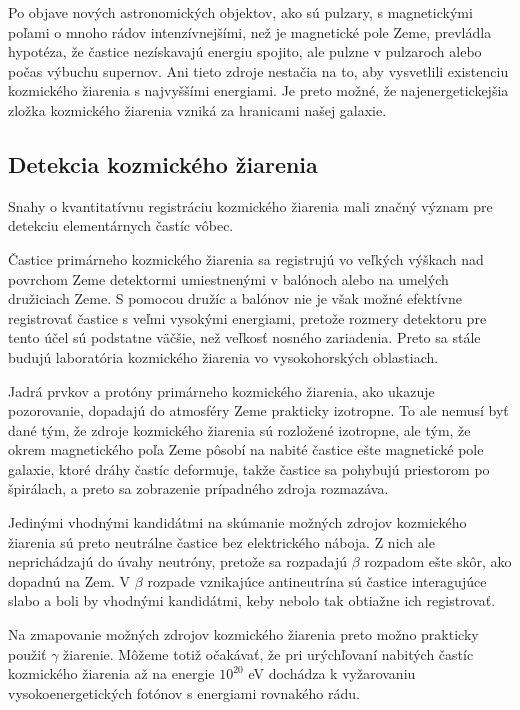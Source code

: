 \documentclass[../../main.tex]{subfiles}
\begin{document}
Po objave nových astronomických objektov, ako sú pulzary, s magnetickými poľami o mnoho rádov intenzívnejšími, než je magnetické pole Zeme, prevládla hypotéza, že častice nezískavajú energiu spojito, ale pulzne v pulzaroch alebo počas výbuchu supernov. Ani tieto zdroje nestačia na to, aby vysvetlili existenciu kozmického žiarenia s najvyššími energiami. Je preto možné, že najenergetickejšia zložka kozmického žiarenia vzniká za hranicami našej galaxie.

\subsection{Detekcia kozmického žiarenia}

Snahy o kvantitatívnu registráciu kozmického žiarenia mali značný význam pre detekciu elementárnych častíc vôbec.

Častice primárneho kozmického žiarenia sa registrujú vo veľkých výškach nad povrchom Zeme detektormi umiestnenými v balónoch alebo na umelých družiciach Zeme. S pomocou družíc a balónov nie je však možné efektívne registrovať častice s veľmi vysokými energiami, pretože rozmery detektoru pre tento účel sú podstatne väčšie, než veľkosť nosného zariadenia. Preto sa stále budujú laboratória kozmického žiarenia vo vysokohorských oblastiach.

Jadrá prvkov a protóny primárneho kozmického žiarenia, ako ukazuje pozorovanie, dopadajú do atmosféry Zeme prakticky izotropne. To ale nemusí byť dané tým, že zdroje kozmického žiarenia sú rozložené izotropne, ale tým, že okrem magnetického poľa Zeme pôsobí na nabité častice ešte magnetické pole galaxie, ktoré dráhy častíc deformuje, takže častice sa pohybujú priestorom po špirálach, a preto sa zobrazenie prípadného zdroja rozmazáva.

Jedinými vhodnými kandidátmi na skúmanie možných zdrojov kozmického žiarenia sú preto neutrálne častice bez elektrického náboja. Z nich ale neprichádzajú do úvahy neutróny, pretože sa rozpadajú $\beta$ rozpadom ešte skôr, ako dopadnú na Zem. V $\beta$ rozpade vznikajúce antineutrína sú častice interagujúce slabo a boli by vhodnými kandidátmi, keby nebolo tak obtiažne ich registrovať.

Na zmapovanie možných zdrojov kozmického žiarenia preto možno prakticky použiť $\gamma$ žiarenie. Môžeme totiž očakávať, že pri urýchľovaní nabitých častíc kozmického žiarenia až na energie $10^{20}$ eV dochádza k vyžarovaniu vysokoenergetických fotónov s energiami rovnakého rádu.
\end{document}
